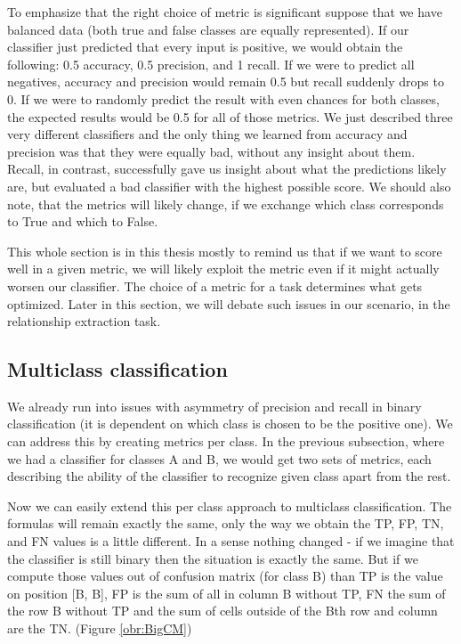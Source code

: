 To emphasize that the right choice of metric is significant suppose that we have balanced data (both true and false classes are equally represented). If our classifier just predicted that every input is positive, we would obtain the following: 0.5 accuracy, 0.5 precision, and 1 recall. If we were to predict all negatives, accuracy and precision would remain 0.5 but recall suddenly drops to 0. If we were to randomly predict the result with even chances for both classes, the expected results would be 0.5 for all of those metrics. We just described three very different classifiers and the only thing we learned from accuracy and precision was that they were equally bad, without any insight about them. Recall, in contrast, successfully gave us insight about what the predictions likely are, but evaluated a bad classifier with the highest possible score. We should also note, that the metrics will likely change, if we exchange which class corresponds to True and which to False. 

This whole section is in this thesis mostly to remind us that if we want to score well in a given metric, we will likely exploit the metric even if it might actually worsen our classifier. The choice of a metric for a task determines what gets optimized. Later in this section, we will debate such issues in our scenario, in the relationship extraction task.





\subsection{Multiclass classification}


We already run into issues with asymmetry of precision and recall in binary classification (it is dependent on which class is chosen to be the positive one). We can address this by creating metrics per class. In the previous subsection, where we had a classifier for classes A and B, we would get two sets of metrics, each describing the ability of the classifier to recognize given class apart from the rest.

Now we can easily extend this per class approach to multiclass classification. The formulas will remain exactly the same, only the way we obtain the TP, FP, TN, and FN values is a little different. In a sense nothing changed - if we imagine that the classifier is still binary then the situation is exactly the same. But if we compute those values out of confusion matrix (for class B) than TP is the value on position [B, B], FP is the sum of all in column B without TP, FN the sum of the row B without TP and the sum of cells outside of the Bth row and column are the TN. (Figure \ref{obr:BigCM})



